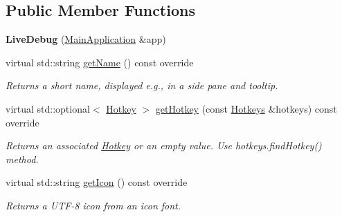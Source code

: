 \subsection*{Public Member Functions}
\begin{DoxyCompactItemize}
\item 
\mbox{\label{classpepr3d_1_1_live_debug_af68bd72aabefe4593946204855ed0f1d}} 
{\bfseries Live\+Debug} (\mbox{\hyperlink{classpepr3d_1_1_main_application}{Main\+Application}} \&app)
\item 
\mbox{\label{classpepr3d_1_1_live_debug_a420f10c060c4c5eb9bcef32353938809}} 
virtual std\+::string \mbox{\hyperlink{classpepr3d_1_1_live_debug_a420f10c060c4c5eb9bcef32353938809}{get\+Name}} () const override
\begin{DoxyCompactList}\small\item\em Returns a short name, displayed e.\+g., in a side pane and tooltip. \end{DoxyCompactList}\item 
\mbox{\label{classpepr3d_1_1_live_debug_acf1c75d3b573f28aef50e9073fa482da}} 
virtual std\+::optional$<$ \mbox{\hyperlink{structpepr3d_1_1_hotkey}{Hotkey}} $>$ \mbox{\hyperlink{classpepr3d_1_1_live_debug_acf1c75d3b573f28aef50e9073fa482da}{get\+Hotkey}} (const \mbox{\hyperlink{classpepr3d_1_1_hotkeys}{Hotkeys}} \&hotkeys) const override
\begin{DoxyCompactList}\small\item\em Returns an associated \mbox{\hyperlink{structpepr3d_1_1_hotkey}{Hotkey}} or an empty value. Use hotkeys.\+find\+Hotkey() method. \end{DoxyCompactList}\item 
\mbox{\label{classpepr3d_1_1_live_debug_ab2ea7bc2137e9b18f3f138d47b793ebb}} 
virtual std\+::string \mbox{\hyperlink{classpepr3d_1_1_live_debug_ab2ea7bc2137e9b18f3f138d47b793ebb}{get\+Icon}} () const override
\begin{DoxyCompactList}\small\item\em Returns a U\+T\+F-\/8 icon from an icon font. \end{DoxyCompactList}\item 
\mbox{\label{classpepr3d_1_1_live_debug_a310f31d348b9437ff1c04e9ca830054d}} 

\end{DoxyCompactItemize}
